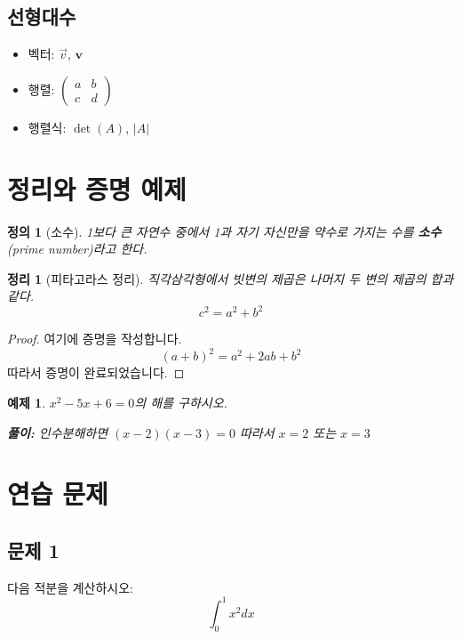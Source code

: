 \documentclass[12pt,a4paper]{article}
\newtheorem{theorem}{정리}[section]
\newtheorem{definition}{정의}[section]
\newtheorem{example}{예제}[section]
\begin{document}
\subsection{선형대수}
\begin{itemize}
    \item 벡터: $\vec{v}$, $\mathbf{v}$
    \item 행렬:
    $\begin{pmatrix}
        a & b \\
        c & d
    \end{pmatrix}$
    \item 행렬식: $\det(A)$, $|A|$
\end{itemize}

\section{정리와 증명 예제}

\begin{definition}[소수]
    1보다 큰 자연수 중에서 1과 자기 자신만을 약수로 가지는 수를 \textbf{소수}(prime number)라고 한다.
\end{definition}

\begin{theorem}[피타고라스 정리]
    직각삼각형에서 빗변의 제곱은 나머지 두 변의 제곱의 합과 같다.
    \[
        c^2 = a^2 + b^2
    \]
\end{theorem}

\begin{proof}
    여기에 증명을 작성합니다.
    \[
        (a+b)^2 = a^2 + 2ab + b^2
    \]
    따라서 증명이 완료되었습니다.
\end{proof}

\begin{example}
    $x^2 - 5x + 6 = 0$의 해를 구하시오.

    \textbf{풀이:}
    인수분해하면 $(x-2)(x-3) = 0$
    따라서 $x = 2$ 또는 $x = 3$
\end{example}

\section{연습 문제}

\subsection{문제 1}
다음 적분을 계산하시오:
\[
    \int_0^1 x^2 dx
\]
\end{document}
